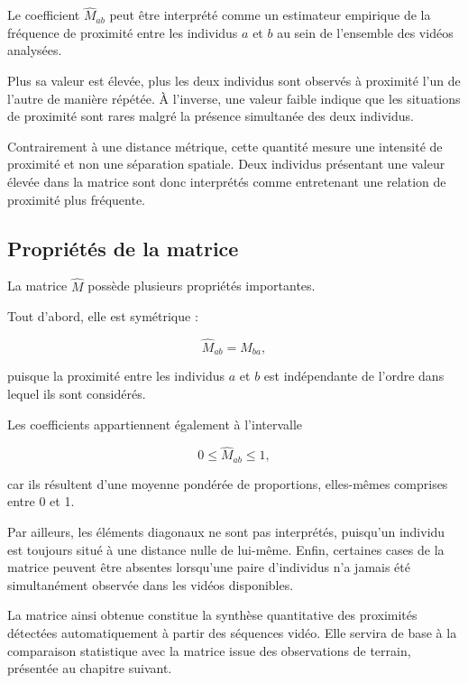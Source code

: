 \documentclass[11pt,a4paper]{report}
\begin{document}
Le coefficient $\widehat{M}_{ab}$ peut être interprété comme un estimateur
empirique de la fréquence de proximité entre les individus $a$ et $b$ au sein de
l'ensemble des vidéos analysées.

Plus sa valeur est élevée, plus les deux individus sont observés à proximité
l'un de l'autre de manière répétée. À l'inverse, une valeur faible indique que
les situations de proximité sont rares malgré la présence simultanée des deux
individus.

Contrairement à une distance métrique, cette quantité mesure une intensité de
proximité et non une séparation spatiale. Deux individus présentant une valeur
élevée dans la matrice sont donc interprétés comme entretenant une relation de
proximité plus fréquente.

\subsection*{Propriétés de la matrice}

La matrice $\widehat{M}$ possède plusieurs propriétés importantes.

Tout d'abord, elle est symétrique :

\begin{equation}
\widehat{M}_{ab}
=
\widehat{M}_{ba},
\end{equation}

puisque la proximité entre les individus $a$ et $b$ est indépendante de l'ordre
dans lequel ils sont considérés.

Les coefficients appartiennent également à l'intervalle

\begin{equation}
0
\leq
\widehat{M}_{ab}
\leq
1,
\end{equation}

car ils résultent d'une moyenne pondérée de proportions, elles-mêmes comprises
entre 0 et 1.

Par ailleurs, les éléments diagonaux ne sont pas interprétés, puisqu'un individu
est toujours situé à une distance nulle de lui-même. Enfin, certaines cases de
la matrice peuvent être absentes lorsqu'une paire d'individus n'a jamais été
simultanément observée dans les vidéos disponibles.

La matrice ainsi obtenue constitue la synthèse quantitative des proximités
détectées automatiquement à partir des séquences vidéo. Elle servira de base à
la comparaison statistique avec la matrice issue des observations de terrain,
présentée au chapitre suivant. 
\end{document}

